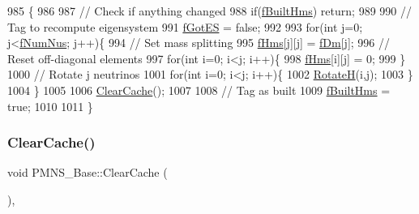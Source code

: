 \begin{DoxyCode}
985 \{
986 
987   \textcolor{comment}{// Check if anything changed}
988   \textcolor{keywordflow}{if}(\hyperlink{classOscProb_1_1PMNS__Base_a9ac3cadeac8db1b90f3152f476244780}{fBuiltHms}) \textcolor{keywordflow}{return};
989   
990   \textcolor{comment}{// Tag to recompute eigensystem}
991   \hyperlink{classOscProb_1_1PMNS__Base_a6dc5cd010d2d70b2324745b4e53e9839}{fGotES} = \textcolor{keyword}{false};
992 
993   \textcolor{keywordflow}{for}(\textcolor{keywordtype}{int} j=0; j<\hyperlink{classOscProb_1_1PMNS__Base_a24bb74bed63569dfe88b18fa6a08060e}{fNumNus}; j++)\{
994     \textcolor{comment}{// Set mass splitting}
995     \hyperlink{classOscProb_1_1PMNS__Base_acd3c8783e7603081eab316ea4c86c766}{fHms}[j][j] = \hyperlink{classOscProb_1_1PMNS__Base_a406a31c3b5d620e5a0cace5b411f9f70}{fDm}[j];
996     \textcolor{comment}{// Reset off-diagonal elements}
997     \textcolor{keywordflow}{for}(\textcolor{keywordtype}{int} i=0; i<j; i++)\{
998       \hyperlink{classOscProb_1_1PMNS__Base_acd3c8783e7603081eab316ea4c86c766}{fHms}[i][j] = 0;
999     \}
1000     \textcolor{comment}{// Rotate j neutrinos}
1001     \textcolor{keywordflow}{for}(\textcolor{keywordtype}{int} i=0; i<j; i++)\{
1002       \hyperlink{classOscProb_1_1PMNS__Base_aae18afd69074211335f49ec40e6011b9}{RotateH}(i,j);
1003     \}
1004   \}
1005 
1006   \hyperlink{classOscProb_1_1PMNS__Base_ac47fd33e69aa6490f99e2fd147a92f03}{ClearCache}();
1007 
1008   \textcolor{comment}{// Tag as built}
1009   \hyperlink{classOscProb_1_1PMNS__Base_a9ac3cadeac8db1b90f3152f476244780}{fBuiltHms} = \textcolor{keyword}{true};
1010 
1011 \}
\end{DoxyCode}
\mbox{\label{classOscProb_1_1PMNS__Base_ac47fd33e69aa6490f99e2fd147a92f03}} 
\subsubsection{\texorpdfstring{Clear\+Cache()}{ClearCache()}}
{\footnotesize\ttfamily void P\+M\+N\+S\+\_\+\+Base\+::\+Clear\+Cache (\begin{DoxyParamCaption}{ }\end{DoxyParamCaption})\hspace{0.3cm}{\ttfamily [virtual]}, {\ttfamily [inherited]}}

